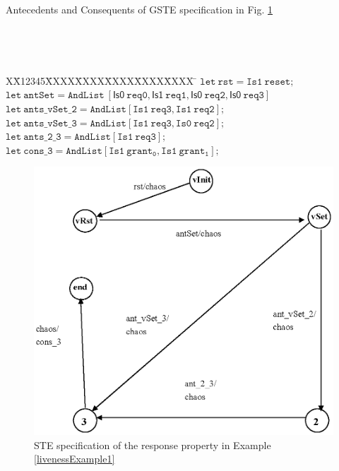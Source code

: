 \documentclass[final]{IEEEtran}
\newlength{\fminilength}
\newenvironment{fmini}[1][\linewidth]
  {\setlength{\fminilength}{#1\fboxsep-2\fboxrule}%
   \vspace{2ex}\noindent\begin{lrbox}{\fminibox}\begin{minipage}{\fminilength}%
   \mbox{ }\hfill\vspace{-2.5ex}}%
  {\end{minipage}\end{lrbox}\vspace{1ex}\hspace{0ex}%
   \framebox{\usebox{\fminibox}}}
\newenvironment{specification}
{\noindent\footnotesize\tt\begin{fmini}\begin{tabbing}X\=X12345\=XXXX\=XXXX\=XXXX\=XXXX\=XXXX
\=\+\kill} {\end{tabbing}\normalfont\end{fmini}}
\begin{document}
\vspace{2mm}
\begin{center}
\begin{table}
\caption{Antecedents and Consequents of   GSTE specification in Fig.
\ref{figLiveness1}}
\begin{specification}
$\mathtt{let\ rst = Is1 \  reset  ;}$\\



$\mathtt{let\ antSet= AndList\ [\mathsf{Is0}\ req0, \mathsf{Is1}\
req1,\mathsf{Is0}\ req2,\mathsf{Is0}\ req3]}$ \\

$\mathtt{let\ ants\_vSet\_2 = AndList [Is1\ req3,Is1\ req2];}$\\

 $\mathtt{let\  ants\_vSet\_3 = AndList [Is1\ req3,Is0\ req2 ];}$\\
$\mathtt{let\ ants\_2\_3 = AndList [Is1\ req3 ];
}$\\

 $\mathtt{let\ cons\_3=AndList[Is1 \ grant_0, Is1\ grant_1];}$\\
 \end{specification}

\end{table}
\end{center}


\begin{figure}[tbph]
\begin{center}
\includegraphics[width=.4\textwidth]{figLiveness1.eps}
\end{center}
\caption{STE specification of the response property in Example
\ref{livenessExample1}} \label{figLiveness1}
\end{figure}
\end{document}
